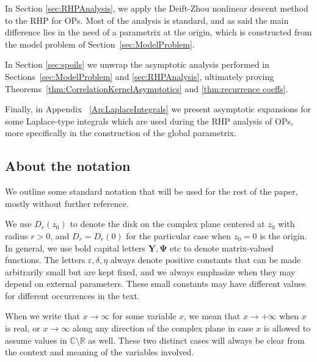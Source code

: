 \documentclass[reqno,a4paper,11pt]{amsart}
\newcommand{\C}{\mathbb{C}}
\newcommand{\R}{\mathbb{R}}
\renewcommand{\bm}{\mathbf}
\theoremstyle{definition}
\theoremstyle{remark}
\numberwithin{equation}{section}
\begin{document}
In Section \ref{sec:RHPAnalysis}, we apply the Deift-Zhou nonlinear descent method to the RHP for OPs. Most of the analysis is standard, and as said the main difference lies in the need of a parametrix at the origin, which is constructed from the model problem of Section~\ref{sec:ModelProblem}.

In Section \ref{sec:spoils} we unwrap the asymptotic analysis performed in Sections~\ref{sec:ModelProblem} and \ref{sec:RHPAnalysis}, ultimately proving Theorems~\ref{thm:CorrelationKernelAsymptotics} and \ref{thm:recurrence coeffs}.

Finally, in Appendix~ \ref{Ap:LaplaceIntegrals} we present asymptotic expansions for some Laplace-type integrals which are used during the RHP analysis of OPs, more specifically in the construction of the global parametrix.

\subsection{About the notation}\label{sec:notation}  
\hfill

We outline some standard notation that will be used for the rest of the paper, mostly without further reference.

    We use $D_r(z_0)$ to denote the disk on the complex plane centered at $z_0$ with radius $r>0$, and $D_r=D_r(0)$ for the particular case when $z_0=0$ is the origin. In general, we use bold capital letters $\bm Y,\bm \Psi$ etc to denote matrix-valued functions. The letters $\varepsilon,\delta,\eta$ always denote positive constants that can be made arbitrarily small but are kept fixed, and we always emphasize when they may depend on external parameters. These small constants may have different values for different occurrences in the text. 

When we write that $x\to \infty$ for some variable $x$, we mean that $x\to +\infty$ when $x$ is real, or $x\to \infty$ along any direction of the complex plane in case $x$ is allowed to assume values in $\C\setminus \R$ as well. These two distinct cases will always be clear from the context and meaning of the variables involved.
\end{document}

